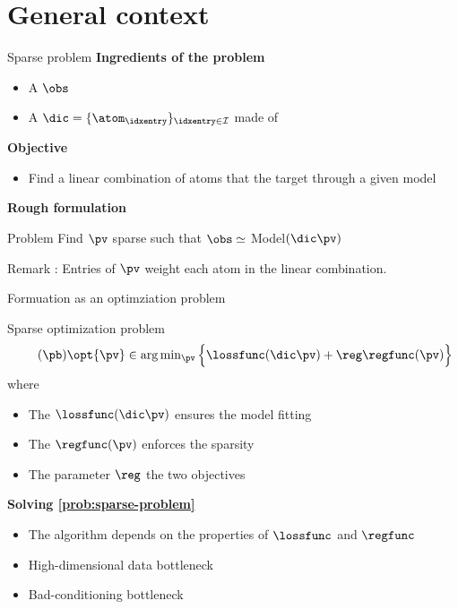 \section{General context}

\begin{frame}{Sparse problem}
  \textbf{Ingredients of the problem}
  \begin{itemize}
    \item A  $\obs$
    \pause
    \item A  $\dic=\{\atom_{\idxentry}\}_{\idxentry\in\mathcal{I}}$ made of  
  \end{itemize}
  \pause
  \textbf{Objective}
  \begin{itemize}
    \item Find a  linear combination of atoms that  the target through a given model
  \end{itemize}
  \pause
  \textbf{Rough formulation}
  \begin{center}
    \begin{minipage}{0.6\linewidth}
      \begin{block}{Problem}
        \centering
        Find $\pv$ sparse such that $\obs \simeq$ Model$(\dic \pv)$
      \end{block}
    \end{minipage}
  \end{center}
  \pause
  Remark : Entries of $\pv$ weight each atom in the linear combination.
\end{frame}

\begin{frame}{Formuation as an optimziation problem}
  \begin{block}{Sparse optimization problem}
    \begin{equation}
        \label{prob:sparse-problem}
        \tag{$\pb$}
        \opt{\pv} \in \textstyle\arg\min_{\pv} \Big\{ \lossfunc(\dic\pv) + \reg\regfunc(\pv) \Big\}
    \end{equation}
    \pause
    where
    \begin{itemize}
        \item The  $\lossfunc(\dic\pv)$ ensures the model fitting
        \pause
        \item The  $\regfunc(\pv)$ enforces the sparsity 
        \pause
        \item The parameter $\reg$  the two objectives
    \end{itemize}
  \end{block}
  \pause
  \textbf{Solving \eqref{prob:sparse-problem}}
  \begin{itemize}
      \item The algorithm depends on the properties of $\lossfunc$ and $\regfunc$
      \pause
      \item High-dimensional data bottleneck
      \pause
      \item Bad-conditioning bottleneck
  \end{itemize}
\end{frame}

